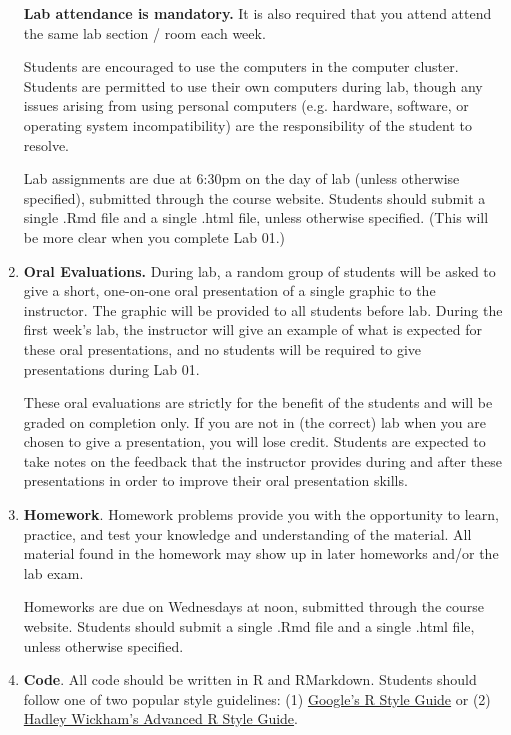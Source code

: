 \documentclass[11pt]{article}
\begin{document}
\begin{enumerate}
\textbf{Lab attendance is mandatory.}  It is also required that you attend attend the same lab section / room each week.

Students are encouraged to use the computers in the computer cluster.  Students are permitted to use their own computers during lab, though any issues arising from using personal computers (e.g. hardware, software, or operating system incompatibility) are the responsibility of the student to resolve.

Lab assignments are due at 6:30pm on the day of lab (unless otherwise specified), submitted through the course website.  Students should submit a single .Rmd file and a single .html file, unless otherwise specified.  (This will be more clear when you complete Lab 01.)

\item {\bf Oral Evaluations.} During lab, a random group of students will be asked to give a short, one-on-one oral presentation of a single graphic to the instructor.  The graphic will be provided to all students before lab.  During the first week's lab, the instructor will give an example of what is expected for these oral presentations, and no students will be required to give presentations during Lab 01.

These oral evaluations are strictly for the benefit of the students and will be graded on completion only.  If you are not in (the correct) lab when you are chosen to give a presentation, you will lose credit.  Students are expected to take notes on the feedback that the instructor provides during and after these presentations in order to improve their oral presentation skills.

\item {\bf Homework}. 
Homework problems provide you with the opportunity to learn, practice, and test your knowledge and understanding of the material.  All material found in the homework may show up in later homeworks and/or the lab exam.

Homeworks are due on Wednesdays at noon, submitted through the course website.  Students should submit a single .Rmd file and a single .html file, unless otherwise specified.

\item {\bf Code}.  All code should be written in R and RMarkdown.  Students should follow one of two popular style guidelines:  (1) \href{https://google.github.io/styleguide/Rguide.xml}{Google's R Style Guide} or (2) \href{http://adv-r.had.co.nz/Style.html}{Hadley Wickham's Advanced R Style Guide}.


\end{enumerate}
\end{document}
